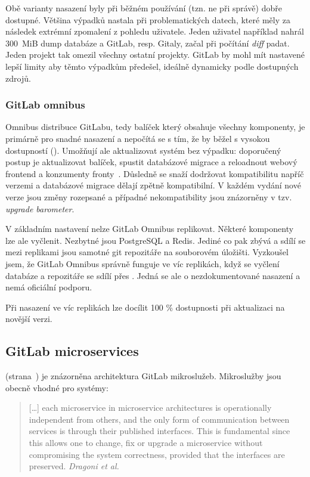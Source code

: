         Obě varianty nasazení byly při běžném používání (tzn. ne při správě) dobře dostupné. Většina výpadků nastala při problematických datech, které měly za následek extrémní zpomalení z pohledu uživatele. Jeden uživatel například nahrál $300$~MiB dump databáze a GitLab, resp. Gitaly, začal při počítání \textit{diff} padat. Jeden projekt tak omezil všechny ostatní projekty. GitLab by mohl mít nastavené lepší limity aby těmto výpadkům předešel, ideálně dynamicky podle dostupných zdrojů.

        \subsubsection{GitLab omnibus}
            Omnibus distribuce GitLabu, tedy balíček který obsahuje všechny komponenty, je primárně pro snadné nasazení a nepočítá se s tím, že by běžel s vysokou dostupností (\HA). Umožňují ale aktualizovat systém bez výpadku: doporučený postup je aktualizovat balíček, spustit databázové migrace a reloadnout webový frontend a konzumenty fronty~\cite{gitlab-omnibus-update}. Důsledně se snaží dodržovat kompatibilitu napříč verzemi a databázové migrace dělají zpětně kompatibilní. V každém vydání nové verze jsou změny rozepsané a případné nekompatibility jsou znázorněny v tzv. \textit{upgrade barometer}.

            V základním nastavení nelze GitLab Omnibus replikovat. Některé komponenty lze ale vyčlenit. Nezbytné jsou PostgreSQL a Redis. Jediné co pak zbývá a sdílí se mezi replikami jsou samotné git repozitáře na souborovém úložišti. Vyzkoušel jsem, že GitLab Omnibus správně funguje ve víc replikách, když se vyčlení databáze a repozitáře se sdílí přes . Jedná se ale o nezdokumentované nasazení a nemá oficiální podporu.

            Při nasazení ve víc replikách lze docílit 100 \% dostupnosti při aktualizaci na novější verzi.

        \subsection{GitLab microservices}
             (strana~\pageref{pic:gitlab-architecture}) je znázorněna architektura GitLab mikroslužeb. Mikroslužby jsou obecně vhodné pro  systémy:

            \begin{quote}
                [\ldots] each microservice in microservice architectures is operationally independent from others, and the only form of communication between services is through their published interfaces. This is fundamental since this allows one to change, fix or upgrade a microservice without compromising the system correctness, provided that the interfaces are preserved. \textit{Dragoni et al.~\cite{dragoni-microservices}}
            \end{quote}

